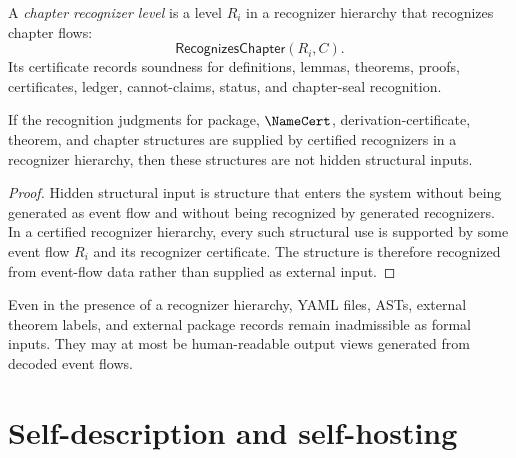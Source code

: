 \begin{definition}
\label{def:recognizer-generated-chapter-level}
A \emph{chapter recognizer level} is a level $R_i$ in a recognizer hierarchy that recognizes chapter flows:
$$
  \mathsf{RecognizesChapter}(R_i,C).
$$
Its certificate records soundness for definitions, lemmas, theorems, proofs, certificates, ledger, cannot-claims, status, and chapter-seal recognition.
\end{definition}

\begin{theorem}
\label{thm:recognizer-generated-hierarchy-removes-hidden-input}
If the recognition judgments for package, $\NameCert$, derivation-certificate, theorem, and chapter structures are supplied by certified recognizers in a recognizer hierarchy, then these structures are not hidden structural inputs.
\end{theorem}

\begin{proof}
Hidden structural input is structure that enters the system without being generated as event flow and without being recognized by generated recognizers. In a certified recognizer hierarchy, every such structural use is supported by some event flow $R_i$ and its recognizer certificate. The structure is therefore recognized from event-flow data rather than supplied as external input.
\end{proof}

\begin{corollary}
\label{cor:recognizer-generated-external-views-inadmissible}
Even in the presence of a recognizer hierarchy, YAML files, ASTs, external theorem labels, and external package records remain inadmissible as formal inputs. They may at most be human-readable output views generated from decoded event flows.
\end{corollary}

\section{Self-description and self-hosting}
\label{sec:recognizer-generated-self-hosting}

